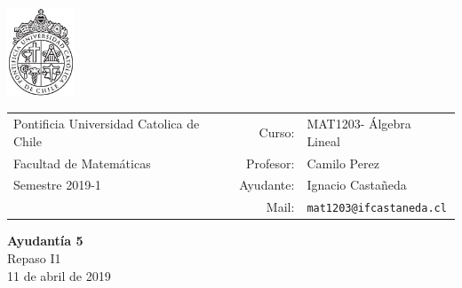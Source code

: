 \documentclass[12pt]{article}
\makeatletter
\newcommand{\ayudantia}{{\sc Ayudantía 5}}
\newcommand{\tituloayu}{Repaso I1}
\newcommand{\fecha}{11 de abril de 2019}
\newcommand{\sigla}{MAT1203}
\newcommand{\nombre}{Álgebra Lineal}
\newcommand{\profesor}{Camilo Perez}
\newcommand{\ano}{2019}
\newcommand{\semestre}{1}
\newcommand{\mail}{mat1203@ifcastaneda.cl}
\makeatother
\begin{document}
\thispagestyle{empty}

\begin{minipage}{2cm}
	\includegraphics[width=2cm]{../../../../img/logo.pdf}
	\vspace{0.5cm}
\end{minipage}
\begin{minipage}{\linewidth}
	\begin{tabular}{lrl}
		{\scriptsize\sc Pontificia Universidad Catolica de Chile} & \hspace*{0.7in}Curso: &
		\sigla  - \nombre\\
		{\sc Facultad de Matemáticas}&
		Profesor: & \profesor \\
		{\sc Semestre \ano-\semestre} & Ayudante: & {Ignacio Castañeda}\\
		& {Mail:} & \texttt{\mail}
	\end{tabular}
\end{minipage}

\vspace{-10mm}
\begin{center}
	{\LARGE\bf \ayudantia}\\
	\vspace{0.1cm}
	{\tituloayu}\\
	\vspace{0.1cm}
	\fecha\\
	\vspace{0.4cm}
\end{center}
\end{document}
